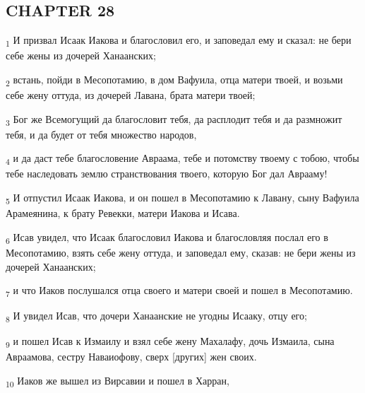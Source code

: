 \subsection{CHAPTER 28}
\begin{tcolorbox}
\textsubscript{1} И призвал Исаак Иакова и благословил его, и заповедал ему и сказал: не бери себе жены из дочерей Ханаанских;
\end{tcolorbox}
\begin{tcolorbox}
\textsubscript{2} встань, пойди в Месопотамию, в дом Вафуила, отца матери твоей, и возьми себе жену оттуда, из дочерей Лавана, брата матери твоей;
\end{tcolorbox}
\begin{tcolorbox}
\textsubscript{3} Бог же Всемогущий да благословит тебя, да расплодит тебя и да размножит тебя, и да будет от тебя множество народов,
\end{tcolorbox}
\begin{tcolorbox}
\textsubscript{4} и да даст тебе благословение Авраама, тебе и потомству твоему с тобою, чтобы тебе наследовать землю странствования твоего, которую Бог дал Аврааму!
\end{tcolorbox}
\begin{tcolorbox}
\textsubscript{5} И отпустил Исаак Иакова, и он пошел в Месопотамию к Лавану, сыну Вафуила Арамеянина, к брату Ревекки, матери Иакова и Исава.
\end{tcolorbox}
\begin{tcolorbox}
\textsubscript{6} Исав увидел, что Исаак благословил Иакова и благословляя послал его в Месопотамию, взять себе жену оттуда, и заповедал ему, сказав: не бери жены из дочерей Ханаанских;
\end{tcolorbox}
\begin{tcolorbox}
\textsubscript{7} и что Иаков послушался отца своего и матери своей и пошел в Месопотамию.
\end{tcolorbox}
\begin{tcolorbox}
\textsubscript{8} И увидел Исав, что дочери Ханаанские не угодны Исааку, отцу его;
\end{tcolorbox}
\begin{tcolorbox}
\textsubscript{9} и пошел Исав к Измаилу и взял себе жену Махалафу, дочь Измаила, сына Авраамова, сестру Наваиофову, сверх [других] жен своих.
\end{tcolorbox}
\begin{tcolorbox}
\textsubscript{10} Иаков же вышел из Вирсавии и пошел в Харран,
\end{tcolorbox}
